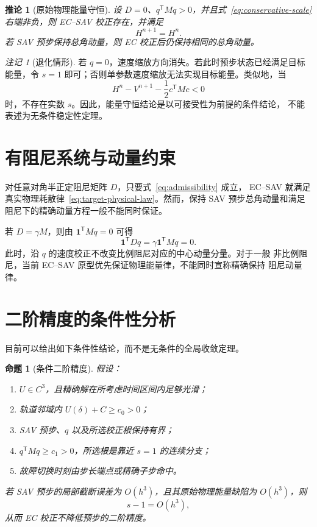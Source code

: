 \documentclass[UTF8,11pt,a4paper]{ctexart}
\newtheorem{proposition}[theorem]{命题}
\newtheorem{corollary}[theorem]{推论}
\theoremstyle{definition}
\theoremstyle{remark}
\newtheorem{remark}[theorem]{注记}
\newcommand{\trans}{\mathsf{T}}
\newcommand{\ones}{\bm{1}}
\begin{document}
\begin{corollary}[原始物理能量守恒]
设 \(D=0\)、\(q^{\trans}Mq>0\)，并且式~\eqref{eq:conservative-scale}
右端非负，则 EC--SAV 校正存在，并满足
\begin{equation}
  \boxed{H^{n+1}=H^n.}
  \label{eq:physical-conservation}
\end{equation}
若 SAV 预步保持总角动量，则 EC 校正后仍保持相同的总角动量。
\end{corollary}

\begin{remark}[退化情形]
若 \(q=0\)，速度缩放方向消失。若此时预步状态已经满足目标能量，令
\(s=1\) 即可；否则单参数速度缩放无法实现目标能量。类似地，当
\begin{equation}
  H^n-V^{n+1}-\frac12c^{\trans}Mc<0
\end{equation}
时，不存在实数 \(s\)。因此，能量守恒结论是以可接受性为前提的条件结论，
不能表述为无条件稳定性定理。
\end{remark}

\section{有阻尼系统与动量约束}

对任意对角半正定阻尼矩阵 \(D\)，只要式~\eqref{eq:admissibility} 成立，
EC--SAV 就满足真实物理耗散律~\eqref{eq:target-physical-law}。然而，保持
SAV 预步总角动量和满足阻尼下的精确动量方程一般不能同时保证。

若 \(D=\gamma M\)，则由 \(\ones^{\trans}Mq=0\) 可得
\begin{equation}
  \ones^{\trans}Dq
  =\gamma\ones^{\trans}Mq=0.
\end{equation}
此时，沿 \(q\) 的速度校正不改变比例阻尼对应的中心动量分量。对于一般
非比例阻尼，当前 EC--SAV 原型优先保证物理能量律，不能同时宣称精确保持
阻尼动量律。

\section{二阶精度的条件性分析}

目前可以给出如下条件性结论，而不是无条件的全局收敛定理。

\begin{proposition}[条件二阶精度]
假设：
\begin{enumerate}[label=(\roman*)]
  \item \(U\in C^3\)，且精确解在所考虑时间区间内足够光滑；
  \item 轨道邻域内 \(U(\delta)+C\geq c_0>0\)；
  \item SAV 预步、\(q\) 以及所选校正根保持有界；
  \item \(q^{\trans}Mq\geq c_1>0\)，所选根是靠近 \(s=1\) 的连续分支；
  \item 故障切换时刻由步长端点或精确子步命中。
\end{enumerate}
若 SAV 预步的局部截断误差为 \(O(h^3)\)，且其原始物理能量缺陷为
\(O(h^3)\)，则
\begin{equation}
  s-1=O(h^3),
  \label{eq:scale-order}
\end{equation}
从而 EC 校正不降低预步的二阶精度。
\end{proposition}
\end{document}

